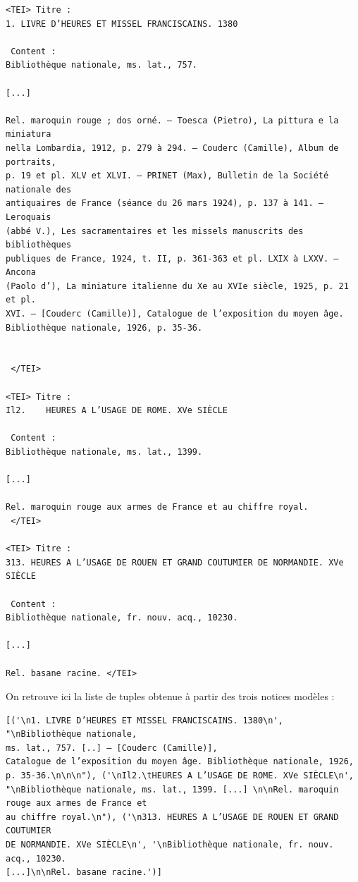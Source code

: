 \documentclass[a4paper,12pt,twoside]{book}
\begin{document}
	\begin{verbatim}
<TEI> Titre : 
1. LIVRE D’HEURES ET MISSEL FRANCISCAINS. 1380
 
 Content : 
Bibliothèque nationale, ms. lat., 757.

[...]

Rel. maroquin rouge ; dos orné. — Toesca (Pietro), La pittura e la miniatura 
nella Lombardia, 1912, p. 279 à 294. — Couderc (Camille), Album de portraits, 
p. 19 et pl. XLV et XLVI. — PRINET (Max), Bulletin de la Société nationale des
antiquaires de France (séance du 26 mars 1924), p. 137 à 141. — Leroquais 
(abbé V.), Les sacramentaires et les missels manuscrits des bibliothèques 
publiques de France, 1924, t. II, p. 361-363 et pl. LXIX à LXXV. — Ancona 
(Paolo d’), La miniature italienne du Xe au XVIe siècle, 1925, p. 21 et pl.
XVI. — [Couderc (Camille)], Catalogue de l’exposition du moyen âge.
Bibliothèque nationale, 1926, p. 35-36.


 </TEI> 

<TEI> Titre : 
Il2.	HEURES A L’USAGE DE ROME. XVe SIÈCLE
 
 Content : 
Bibliothèque nationale, ms. lat., 1399.

[...]

Rel. maroquin rouge aux armes de France et au chiffre royal.
 </TEI> 

<TEI> Titre : 
313. HEURES A L’USAGE DE ROUEN ET GRAND COUTUMIER DE NORMANDIE. XVe SIÈCLE 
 
 Content : 
Bibliothèque nationale, fr. nouv. acq., 10230.

[...]

Rel. basane racine. </TEI> 
	\end{verbatim}
	
On retrouve ici la liste de tuples obtenue à partir des trois notices modèles :

\begin{verbatim}
[('\n1. LIVRE D’HEURES ET MISSEL FRANCISCAINS. 1380\n', "\nBibliothèque nationale, 
ms. lat., 757. [..] — [Couderc (Camille)], 
Catalogue de l’exposition du moyen âge. Bibliothèque nationale, 1926,
p. 35-36.\n\n\n"), ('\nIl2.\tHEURES A L’USAGE DE ROME. XVe SIÈCLE\n', 
"\nBibliothèque nationale, ms. lat., 1399. [...] \n\nRel. maroquin rouge aux armes de France et 
au chiffre royal.\n"), ('\n313. HEURES A L’USAGE DE ROUEN ET GRAND COUTUMIER 
DE NORMANDIE. XVe SIÈCLE\n', '\nBibliothèque nationale, fr. nouv. acq., 10230.
[...]\n\nRel. basane racine.')]
\end{verbatim}
\end{document}
